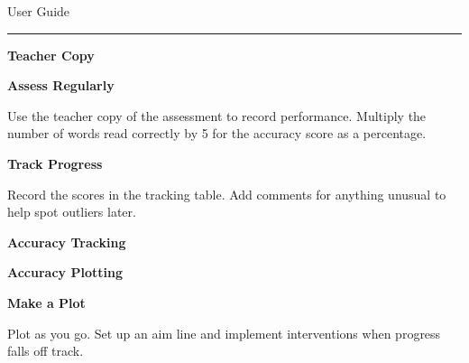 \documentclass[12pt]{memoir}
\begin{document}
\noindent
User Guide
\smallskip
\hrule

\vfill

\begin{minipage}{0.3\textwidth}
\begin{flushleft}
\footnotesize \textbf{Teacher Copy}
\end{flushleft}
\end{minipage}
\hspace{1cm}
\begin{minipage}{0.5\textwidth}
{\large \textbf{Assess Regularly}}

Use the teacher copy of the assessment to record performance. Multiply the
number of words read correctly by 5 for the accuracy score as a percentage.
\end{minipage}

\vfill

\begin{minipage}{0.5\textwidth}
{\large \textbf{Track Progress}}

Record the scores in the tracking table. Add comments for anything unusual
to help spot outliers later. 
\end{minipage}
\hspace{1cm}
\begin{minipage}{0.3\textwidth}
\begin{flushleft}
\footnotesize \textbf{Accuracy Tracking}
\end{flushleft}
\end{minipage}

\vfill

\begin{minipage}{0.4\textwidth}
\begin{flushleft}
\footnotesize \textbf{Accuracy Plotting}
\end{flushleft}
\end{minipage}
\hspace{1cm}
\begin{minipage}{0.4\textwidth}
{\large \textbf{Make a Plot}}

Plot as you go. Set up an aim line and implement interventions when progress
falls off track.
\end{minipage}

\vfill
\end{document}
